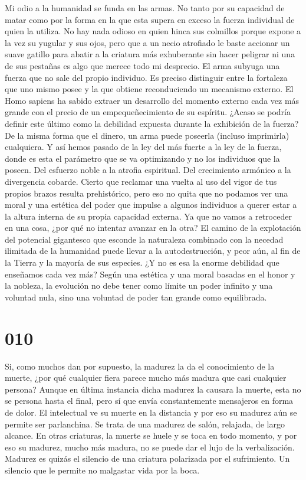 \documentclass[a4paper,11pt,openright,twocolumn]{book}
\begin{document}
Mi odio a la humanidad se funda en las armas. No tanto por su capacidad de matar como por la forma en la que esta supera
en exceso la fuerza individual de quien la utiliza. No hay nada odioso en quien hinca sus colmillos porque expone a la vez su yugular y sus ojos, pero que a un necio atrofiado le baste accionar un suave gatillo para abatir a la criatura más exhuberante sin hacer peligrar ni una de sus pestañas es algo que merece todo mi desprecio. El arma subyuga una fuerza que no sale del propio individuo. Es preciso distinguir entre la fortaleza que uno mismo posee y la que obtiene reconduciendo un mecanismo externo. El Homo sapiens ha sabido extraer un desarrollo del momento externo cada vez más grande con el precio de un empequeñecimiento de su espíritu. ¿Acaso se podría definir este último como la debilidad expuesta durante la exhibición de la fuerza? De la misma forma que el dinero, un arma puede poseerla (incluso imprimirla) cualquiera. Y así hemos pasado de la ley del más fuerte a la ley de la fuerza, donde es esta el parámetro que se va optimizando y no los individuos que la poseen. Del esfuerzo noble a la atrofia espiritual. Del crecimiento armónico a la divergencia cobarde. Cierto que reclamar una vuelta al uso del vigor de tus propios brazos resulta prehistórico, pero eso no quita que no podamos ver una moral y una estética del poder que impulse a algunos individuos a querer estar a la altura interna de su propia capacidad externa. Ya que no vamos a retroceder en una cosa, ¿por qué no intentar avanzar en la otra? El camino de la explotación del potencial gigantesco que esconde la naturaleza combinado con la necedad ilimitada de la humanidad puede llevar a la autodestrucción, y peor aún, al fin de la Tierra y la mayoría de sus especies. ¿Y no es esa la enorme debilidad que enseñamos cada vez más? Según una estética y una moral basadas en el honor y la nobleza, la evolución no debe tener como límite un poder infinito y una voluntad nula, sino una voluntad de poder tan grande como equilibrada. 

\section*{010}

Si, como muchos dan por supuesto, la madurez la da el conocimiento de la muerte, ¿por qué cualquier fiera parece mucho más
madura que casi cualquier persona?  Aunque en última instancia dicha madurez la causara la muerte, esta no se persona hasta el final, pero sí que envía constantemente mensajeros en forma de dolor. El intelectual ve su muerte en la distancia y por eso su madurez aún se permite ser parlanchina. Se trata de una madurez de salón, relajada, de largo alcance.  En otras criaturas, la muerte se huele y se toca en todo momento, y por eso su madurez, mucho más madura, no se puede dar el lujo de la verbalización. Madurez es quizás el silencio de una criatura polarizada por el sufrimiento. Un silencio que le permite no malgastar vida por la boca.
\end{document}
